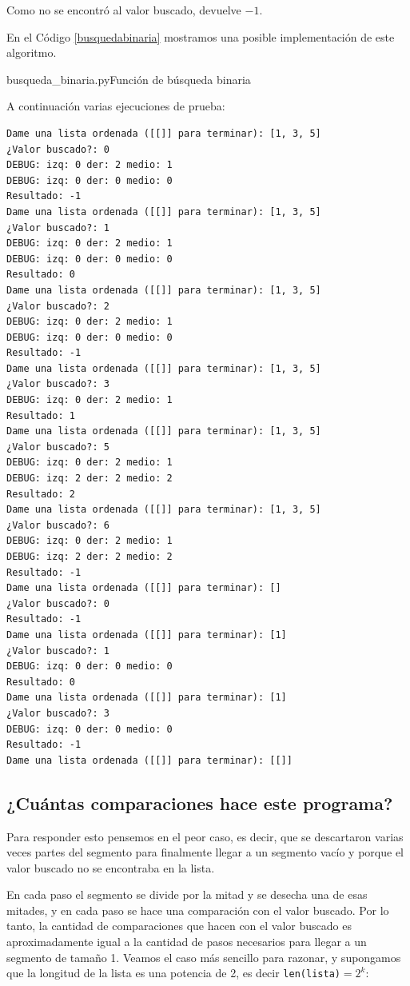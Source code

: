Como no se encontró al valor buscado, devuelve $-1$.

En el Código \ref{busquedabinaria} mostramos una posible implementación de
este algoritmo. \\

\begin{codigo}{busqueda\_binaria.py}{Función de búsqueda binaria}
\label{busquedabinaria}

\end{codigo}

A continuación varias ejecuciones de prueba:

\begin{verbatim}
Dame una lista ordenada ([[]] para terminar): [1, 3, 5]
¿Valor buscado?: 0
DEBUG: izq: 0 der: 2 medio: 1
DEBUG: izq: 0 der: 0 medio: 0
Resultado: -1
Dame una lista ordenada ([[]] para terminar): [1, 3, 5]
¿Valor buscado?: 1
DEBUG: izq: 0 der: 2 medio: 1
DEBUG: izq: 0 der: 0 medio: 0
Resultado: 0
Dame una lista ordenada ([[]] para terminar): [1, 3, 5]
¿Valor buscado?: 2
DEBUG: izq: 0 der: 2 medio: 1
DEBUG: izq: 0 der: 0 medio: 0
Resultado: -1
Dame una lista ordenada ([[]] para terminar): [1, 3, 5]
¿Valor buscado?: 3
DEBUG: izq: 0 der: 2 medio: 1
Resultado: 1
Dame una lista ordenada ([[]] para terminar): [1, 3, 5]
¿Valor buscado?: 5
DEBUG: izq: 0 der: 2 medio: 1
DEBUG: izq: 2 der: 2 medio: 2
Resultado: 2
Dame una lista ordenada ([[]] para terminar): [1, 3, 5]
¿Valor buscado?: 6
DEBUG: izq: 0 der: 2 medio: 1
DEBUG: izq: 2 der: 2 medio: 2
Resultado: -1
Dame una lista ordenada ([[]] para terminar): []
¿Valor buscado?: 0
Resultado: -1
Dame una lista ordenada ([[]] para terminar): [1]
¿Valor buscado?: 1
DEBUG: izq: 0 der: 0 medio: 0
Resultado: 0
Dame una lista ordenada ([[]] para terminar): [1]
¿Valor buscado?: 3
DEBUG: izq: 0 der: 0 medio: 0
Resultado: -1
Dame una lista ordenada ([[]] para terminar): [[]]
\end{verbatim}

\subsection*{¿Cuántas comparaciones hace este programa?}

Para responder esto pensemos en el peor caso, es decir, que se descartaron
varias veces partes del segmento para finalmente llegar a un segmento vacío y
porque el valor buscado no se encontraba en la lista.

En cada paso el segmento se divide por la mitad y se desecha una de esas
mitades, y en cada paso se hace una comparación con el valor buscado. Por lo
tanto, la cantidad de comparaciones que hacen con el valor buscado es
aproximadamente igual a la cantidad de pasos necesarios para llegar a un
segmento de tamaño 1.
Veamos el caso más sencillo para razonar, y supongamos que la longitud de la
lista es una potencia de 2, es decir \lstinline+len(lista)+$= 2^k$:


